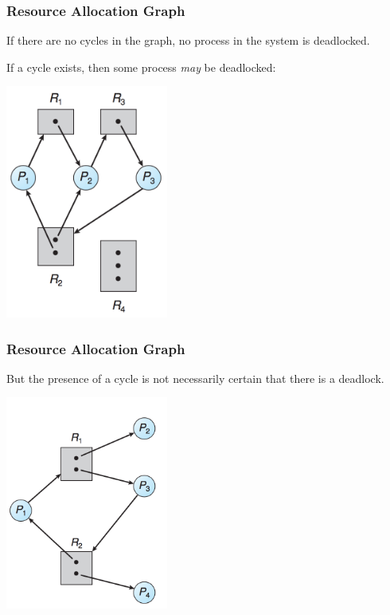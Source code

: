 \begin{frame}
	\frametitle{Resource Allocation Graph}

	If there are no cycles in the graph, no process in the system is deadlocked.

	If a cycle exists, then some process \textit{may} be deadlocked:

	\begin{center}
		\includegraphics[width=0.40\textwidth]{images/rag2.png}
	\end{center}

\end{frame}

\begin{frame}
	\frametitle{Resource Allocation Graph}

	But the presence of a cycle is not necessarily certain that there is a deadlock.

	\begin{center}
		\includegraphics[width=0.40\textwidth]{images/rag3.png}
	\end{center}


\end{frame}


